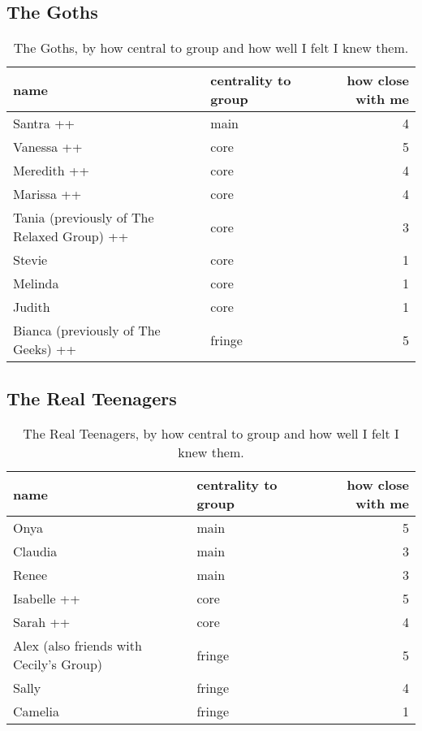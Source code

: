 \subsection{The Goths}
\nopagebreak
\begin{table}[ht]
\caption{The Goths, by how central to group and how well I felt I knew them.}\label{append:Goths}
	\centering
		\begin{tabular}{llr} \\
		\hline
					name & centrality to group & how close with me  \\
			\hline
Santra ++ & main & 4 \\
Vanessa ++ & core & 5 \\
Meredith ++ & core & 4 \\
Marissa ++ & core & 4 \\
Tania (previously of The Relaxed Group) ++ & core & 3 \\
Stevie & core & 1 \\
Melinda & core & 1 \\
Judith & core & 1 \\
Bianca (previously of The Geeks) ++ & fringe & 5 \\
   \hline
				\end{tabular}
\end{table}

\pagebreak
\subsection{The Real Teenagers}
\nopagebreak
\begin{table}[ht]
\caption{The Real Teenagers, by how central to group and how well I felt I knew them.}\label{append:RealTeens}
	\centering
		\begin{tabular}{llr} \\
		\hline
							name & centrality to group & how close with me  \\
			\hline
Onya & main & 5 \\
Claudia & main & 3 \\
Renee & main & 3 \\
Isabelle ++ & core & 5 \\
Sarah ++ & core & 4 \\
Alex (also friends with Cecily's Group) & fringe & 5 \\
Sally & fringe & 4 \\
Camelia & fringe & 1 \\
   \hline
				\end{tabular}
\end{table}


